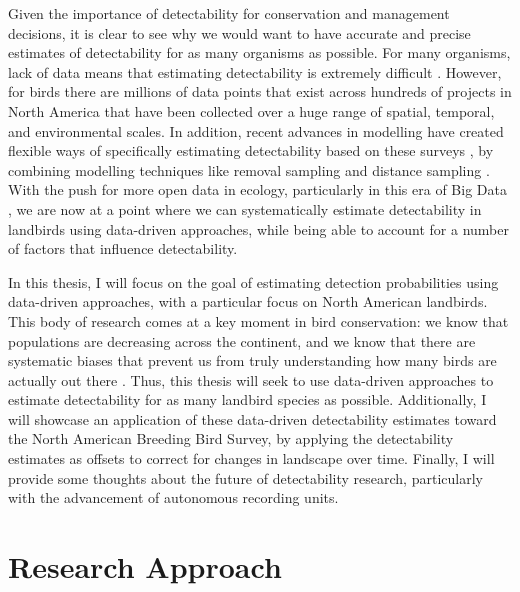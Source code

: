 \par Given the importance of detectability for conservation and management decisions, it is clear to see why we would want to have accurate and precise estimates of detectability for as many organisms as possible.
For many organisms, lack of data means that estimating detectability is extremely difficult \citep{bennett_how_2024}.
However, for birds there are millions of data points that exist across hundreds of projects in North America that have been collected over a huge range of spatial, temporal, and environmental scales.
In addition, recent advances in modelling have created flexible ways of specifically estimating detectability based on these surveys \citep{solymos_calibrating_2013}, by combining modelling techniques like removal sampling \citep{alldredge_time--detection_2007, farnsworth_removal_2002} and distance sampling \citep{buckland_introduction_2001, buckland_distance_2015}.
With the push for more open data in ecology, particularly in this era of Big Data \citep{binley_minimizing_2023}, we are now at a point where we can systematically estimate detectability in landbirds using data-driven approaches, while being able to account for a number of factors that influence detectability.

\par In this thesis, I will focus on the goal of estimating detection probabilities using data-driven approaches, with a particular focus on North American landbirds.
This body of research comes at a key moment in bird conservation: we know that populations are decreasing across the continent, and we know that there are systematic biases that prevent us from truly understanding how many birds are actually out there \citep{stanton_estimating_2019, solymos_calibrating_2013, solymos_lessons_2020}.
Thus, this thesis will seek to use data-driven approaches to estimate detectability for as many landbird species as possible.
Additionally, I will showcase an application of these data-driven detectability estimates toward the North American Breeding Bird Survey, by applying the detectability estimates as offsets to correct for changes in landscape over time.
Finally, I will provide some thoughts about the future of detectability research, particularly with the advancement of autonomous recording units.

\section{Research Approach}

